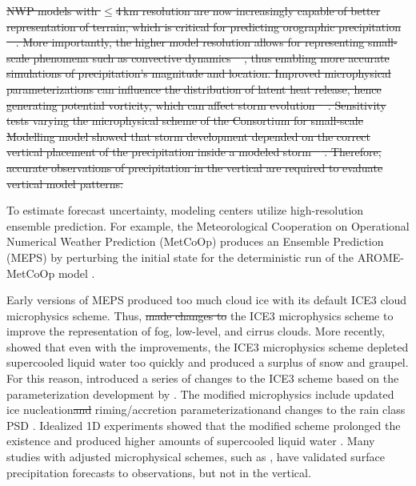 \documentclass{ametsocV5}
\providecommand{\DIFadd}[1]{{\protect\color{blue}\uwave{#1}}} %
\providecommand{\DIFdel}[1]{{\protect\color{red}\sout{#1}}}                      %
\providecommand{\DIFaddbegin}{} %
\providecommand{\DIFaddend}{} %
\providecommand{\DIFdelbegin}{} %
\providecommand{\DIFdelend}{} %
\newcommand{\DIFscaledelfig}{0.5}
\newlength{\DIFdelgraphicswidth} %
\newlength{\DIFdelgraphicsheight} %
\newcommand{\DIFaddincludegraphics}[2][]{{\color{blue}\fbox{\DIFOincludegraphics[#1]{#2}}}} %
\newcommand{\DIFdelincludegraphics}[2][]{%
\sbox{\DIFdelgraphicsbox}{\DIFOincludegraphics[#1]{#2}}%
\settoboxwidth{\DIFdelgraphicswidth}{\DIFdelgraphicsbox} %
\settoboxtotalheight{\DIFdelgraphicsheight}{\DIFdelgraphicsbox} %
\scalebox{\DIFscaledelfig}{%
\parbox[b]{\DIFdelgraphicswidth}{\usebox{\DIFdelgraphicsbox}\\[-\baselineskip] \rule{\DIFdelgraphicswidth}{0em}}\llap{\resizebox{\DIFdelgraphicswidth}{\DIFdelgraphicsheight}{%
\setlength{\unitlength}{\DIFdelgraphicswidth}%
\begin{picture}(1,1)%
\thicklines\linethickness{2pt} %
{\color[rgb]{1,0,0}\put(0,0){\framebox(1,1){}}}%
{\color[rgb]{1,0,0}\put(0,0){\line( 1,1){1}}}%
{\color[rgb]{1,0,0}\put(0,1){\line(1,-1){1}}}%
\end{picture}%
}\hspace*{3pt}}} %
} %
\DeclareRobustCommand{\DIFaddbegin}{\DIFOaddbegin \let\includegraphics\DIFaddincludegraphics} %
\DeclareRobustCommand{\DIFaddend}{\DIFOaddend \let\includegraphics\DIFOincludegraphics} %
\DeclareRobustCommand{\DIFdelbegin}{\DIFOdelbegin \let\includegraphics\DIFdelincludegraphics} %
\DeclareRobustCommand{\DIFdelend}{\DIFOaddend \let\includegraphics\DIFOincludegraphics} %
\begin{document}
    \DIFdelbegin \DIFdel{NWP models with $\leq$4\,km resolution are now increasingly capable of better representation of terrain, which is critical for predicting orographic precipitation \mbox{%
\citep{colle_59_2000, colle_1314_2005, garvert_1314_2005, schwartz_reproducing_2014}}\hspace{0pt}%
. More importantly, the higher model resolution allows for representing small-scale phenomena such as convective dynamics \mbox{%
\citep{gowan_validation_2018}}\hspace{0pt}%
, thus enabling more accurate simulations of precipitation's magnitude and location. Improved microphysical parameterizations can influence the distribution of latent heat release, hence generating potential vorticity, which can affect storm evolution \mbox{%
\citep{joos_influence_2012}}\hspace{0pt}%
. Sensitivity tests varying the microphysical scheme of the Consortium for small-scale Modelling model showed that storm development depended on the correct vertical placement of the precipitation inside a modeled storm \mbox{%
\citep{joos_influence_2012}}\hspace{0pt}%
. Therefore, accurate observations of precipitation in the vertical are required to evaluate vertical model patterns. 
    }%

\DIFdelend %
    To estimate forecast uncertainty, modeling centers utilize high-resolution ensemble prediction. For example, the Meteorological Cooperation on Operational Numerical Weather Prediction (MetCoOp) produces an Ensemble Prediction (MEPS) by perturbing the initial state for the deterministic run of the  AROME-MetCoOp model \citep[AROME-Applications of Research to Operations at Mesoscale;][]{frogner_convection-permitting_2019}. 

    Early versions of MEPS produced too much cloud ice with its default ICE3 cloud microphysics scheme. Thus, \citet{muller_arome-metcoop:_2017} \DIFdelbegin \DIFdel{made changes to }\DIFdelend \DIFaddbegin \DIFadd{changed }\DIFaddend the ICE3 microphysics scheme to improve the representation of fog, low-level, and cirrus clouds. More recently, \citet{engdahl_improving_2020} showed that even with the improvements, the ICE3 microphysics scheme depleted supercooled liquid water too quickly and produced a surplus of snow and graupel. For this reason, \citet{engdahl_improving_2020} introduced a series of changes to the ICE3 scheme based on the parameterization development by \citet{thompson_explicit_2004,thompson_explicit_2008}. The modified microphysics include updated ice nucleation\DIFdelbegin \DIFdel{and }\DIFdelend \DIFaddbegin \DIFadd{, }\DIFaddend riming/accretion parameterization\DIFaddbegin \DIFadd{, }\DIFaddend and changes to the rain class PSD \citep{engdahl_improving_2020}. Idealized 1D experiments showed that the modified scheme prolonged the existence and produced higher amounts of supercooled liquid water \citep{engdahl_improving_2020}. Many studies with adjusted microphysical schemes, such as \cite{liu_high-resolution_2011}, have validated surface precipitation forecasts to observations, but not in the vertical.
\end{document}
